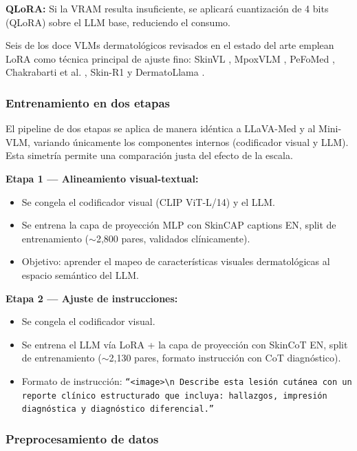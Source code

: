 \documentclass[11pt, a4paper]{article}
\begin{document}
\textbf{QLoRA:} Si la VRAM resulta insuficiente, se aplicará cuantización de 4 bits (QLoRA) \cite{dettmers_qlora_2023} sobre el LLM base, reduciendo el consumo.

Seis de los doce VLMs dermatológicos revisados en el estado del arte emplean LoRA como técnica principal de ajuste fino: SkinVL \cite{zhao_mm-skin_2025}, MpoxVLM \cite{xu_mpoxvlm_2024}, PeFoMed \cite{he_pefomed_2024}, Chakrabarti et al. \cite{chakrabarti_automated_2025}, Skin-R1 \cite{kang_skinr1_2025} y DermatoLlama \cite{yilmaz_dermatollama_2025}.

\subsubsection{Entrenamiento en dos etapas}

El pipeline de dos etapas se aplica de manera idéntica a LLaVA-Med y al Mini-VLM, variando únicamente los componentes internos (codificador visual y LLM). Esta simetría permite una comparación justa del efecto de la escala.

\textbf{Etapa 1 — Alineamiento visual-textual:}
\begin{itemize}
    \item Se congela el codificador visual (CLIP ViT-L/14) y el LLM.
    \item Se entrena la capa de proyección MLP con SkinCAP captions EN, split de entrenamiento ($\sim$2,800 pares, validados clínicamente).
    \item Objetivo: aprender el mapeo de características visuales dermatológicas al espacio semántico del LLM.
\end{itemize}

\textbf{Etapa 2 — Ajuste de instrucciones:}
\begin{itemize}
    \item Se congela el codificador visual.
    \item Se entrena el LLM vía LoRA + la capa de proyección con SkinCoT EN, split de entrenamiento ($\sim$2,130 pares, formato instrucción con CoT diagnóstico).
    \item Formato de instrucción: \texttt{``<image>\textbackslash n Describe esta lesión cutánea con un reporte clínico estructurado que incluya: hallazgos, impresión diagnóstica y diagnóstico diferencial.''}
\end{itemize}

\subsubsection{Preprocesamiento de datos}
\end{document}
